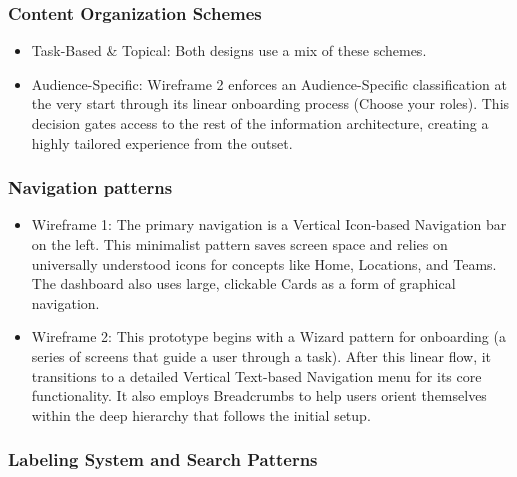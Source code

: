 \documentclass[]{VUMIFTemplateClass}
\begin{document}
\subsubsection{Content Organization Schemes}

\begin{itemize}
    \item Task-Based \& Topical: Both designs use a mix of these schemes.
    \item Audience-Specific: Wireframe 2 enforces an Audience-Specific classification at the very start through its linear onboarding process (Choose your roles). This decision gates access to the rest of the information architecture, creating a highly tailored experience from the outset.
\end{itemize}


\subsubsection{Navigation patterns}

\begin{itemize}
    \item Wireframe 1: The primary navigation is a Vertical Icon-based Navigation bar on the left. This minimalist pattern saves screen space and relies on universally understood icons for concepts like Home, Locations, and Teams. The dashboard also uses large, clickable Cards as a form of graphical navigation.
    \item Wireframe 2: This prototype begins with a Wizard pattern for onboarding (a series of screens that guide a user through a task). After this linear flow, it transitions to a detailed Vertical Text-based Navigation menu for its core functionality. It also employs Breadcrumbs to help users orient themselves within the deep hierarchy that follows the initial setup.
\end{itemize}

\subsubsection{Labeling System and Search Patterns}



\end{document}
